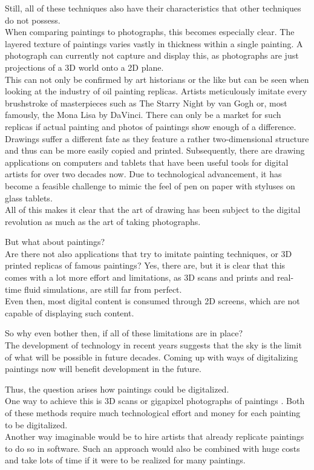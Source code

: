 Still, all of these techniques also have their characteristics that other techniques do not possess. \\
When comparing paintings to photographs, this becomes especially clear.
The layered texture of paintings varies vastly in thickness within a single painting.
A photograph can currently not capture and display this, as photographs are just projections of a 3D world onto a 2D plane.\\
This can not only be confirmed by art historians or the like but can be seen when looking at the industry of oil painting replicas.
Artists meticulously imitate every brushstroke of masterpieces such as The Starry Night by van Gogh or, most famously, the Mona Lisa by DaVinci.
There can only be a market for such replicas if actual painting and photos of paintings show enough of a difference.\\
Drawings suffer a different fate as they feature a rather two-dimensional structure and thus can be more easily copied and printed.
Subsequently, there are drawing applications on computers and tablets that have been useful tools for digital artists for over two decades now.
Due to technological advancement, it has become a feasible challenge to mimic the feel of pen on paper with styluses on glass tablets.\\
All of this makes it clear that the art of drawing has been subject to the digital revolution as much as the art of taking photographs.

But what about paintings?\\
Are there not also applications that try to imitate painting techniques, or 3D printed replicas of famous paintings?
Yes, there are, but it is clear that this comes with a lot more effort and limitations, as 3D scans and prints and real-time fluid simulations, are still far from perfect.\\
Even then, most digital content is consumed through 2D screens, which are not capable of displaying such content.

So why even bother then, if all of these limitations are in place?\\
The development of technology in recent years suggests that the sky is the limit of what will be possible in future decades.
Coming up with ways of digitalizing paintings now will benefit development in the future.

Thus, the question arises how paintings could be digitalized.\\
One way to achieve this is 3D scans \cite{3Dscan_art} or gigapixel photographs of paintings \cite{googleartproject}.
Both of these methods require much technological effort and money for each painting to be digitalized.\\
Another way imaginable would be to hire artists that already replicate paintings to do so in software.
Such an approach would also be combined with huge costs and take lots of time if it were to be realized for many paintings.

